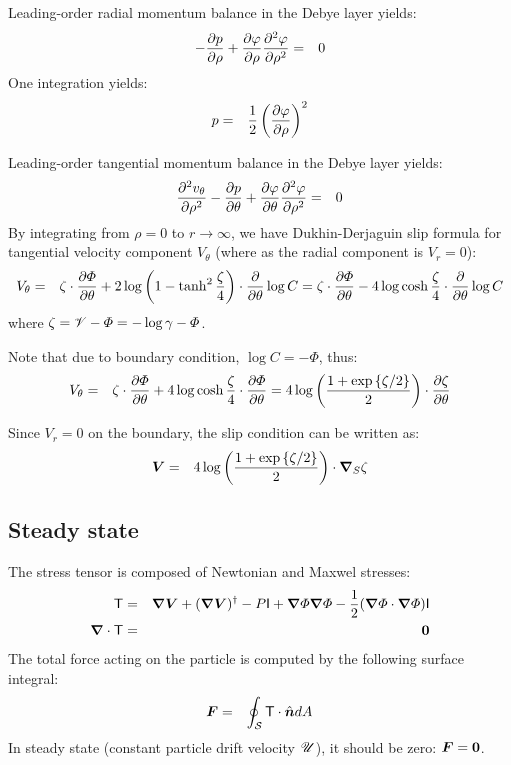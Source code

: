 Leading-order radial momentum balance in the Debye layer yields:
\begin{eqnarray} \nonumber
- \frac{\partial p}{\partial \rho} + \frac{\partial \varphi}{\partial \rho} \frac{\partial ^2\varphi}{\partial \rho^2} &=& 0
\end{eqnarray}
One integration yields:
\begin{eqnarray} \nonumber
p &=& \frac{1}{2}\left(\frac{\partial \varphi}{\partial \rho}\right)^2
\end{eqnarray}

Leading-order tangential momentum balance in the Debye layer yields:
\begin{eqnarray} \nonumber
\frac{\partial ^2 v_\theta}{\partial \rho^2} - \frac{\partial p}{\partial \theta} 
 + \frac{\partial \varphi}{\partial \theta} \frac{\partial ^2\varphi}{\partial \rho^2} &=& 0
\end{eqnarray}
By integrating from $\rho = 0$ to $r \rightarrow \infty$, we have Dukhin-Derjaguin slip formula
for tangential velocity component $V_\theta$ (where as the radial component is $V_r = 0$):
\begin{eqnarray} \nonumber
V_\theta &=& \zeta \cdot \frac{\partial \varPhi}{\partial \theta} + 
      2\log\left(1 - \tanh^2 \frac{\zeta}{4}\right) \cdot \frac{\partial }{\partial \theta} \log C 
 = \zeta \cdot \frac{\partial \varPhi}{\partial \theta} -
      4\log\cosh \frac{\zeta}{4} \cdot \frac{\partial }{\partial \theta} \log C
\end{eqnarray}
where $\zeta = \mathscr{V} - \varPhi = -\log\gamma - \varPhi$.

Note that due to boundary condition, $\log C = -\varPhi$, thus:
\begin{eqnarray} \nonumber
V_\theta &=& \zeta \cdot \frac{\partial \varPhi}{\partial \theta} + 
      4\log\cosh \frac{\zeta}{4} \cdot \frac{\partial \varPhi}{\partial \theta} = 
4\log\left(\frac{1 + \exp\left\{\zeta/2\right\}}{2}\right) \cdot \frac{\partial \zeta}{\partial \theta}
\end{eqnarray}

Since $V_r = 0$ on the boundary, the slip condition can be written as:
\begin{eqnarray}
\boldsymbol{V} &=& 
4\log\left(\frac{1 + \exp\left\{\zeta/2\right\}}{2}\right) \cdot \boldsymbol{\nabla}_S \zeta
\end{eqnarray}


\subsection{Steady state}
The stress tensor is composed of Newtonian and Maxwel stresses:
\begin{eqnarray}
\mathsf{T} &=& \boldsymbol{\nabla} \boldsymbol{V} + (\boldsymbol{\nabla} \boldsymbol{V})^\dagger - P \mathsf{I}
+ \boldsymbol{\nabla} \varPhi \boldsymbol{\nabla} \varPhi - \frac{1}{2} (\boldsymbol{\nabla} \varPhi \cdot \boldsymbol{\nabla} \varPhi) \mathsf{I} \\
\boldsymbol{\nabla} \cdot \mathsf{T} &=& \boldsymbol{0}
\end{eqnarray}
The total force acting on the particle is computed by the following surface integral:
\begin{eqnarray}
\boldsymbol{F} &=& \oint_\mathcal{S} \mathsf{T} \cdot \hat{\boldsymbol{n}}  dA 
\end{eqnarray}
In steady state (constant particle drift velocity $\mathscr{U}$), it should be zero: $\boldsymbol{F} = \boldsymbol{0}$.
